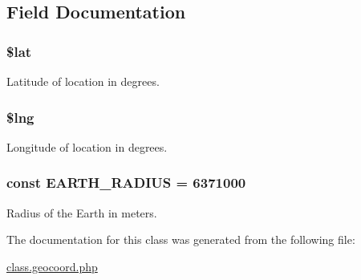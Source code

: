 \subsection{Field Documentation}
\subsubsection[{\texorpdfstring{\$lat}{$lat}}]{\setlength{\rightskip}{0pt plus 5cm}\$lat}\hypertarget{class_geo_coord_af498b42b83afed4dfe0af05fd802776c}{}\label{class_geo_coord_af498b42b83afed4dfe0af05fd802776c}


Latitude of location in degrees. 

\subsubsection[{\texorpdfstring{\$lng}{$lng}}]{\setlength{\rightskip}{0pt plus 5cm}\$lng}\hypertarget{class_geo_coord_ab27bfa6a9380a8d89e1a8e001b276410}{}\label{class_geo_coord_ab27bfa6a9380a8d89e1a8e001b276410}


Longitude of location in degrees. 

\subsubsection[{\texorpdfstring{E\+A\+R\+T\+H\+\_\+\+R\+A\+D\+I\+US}{EARTH_RADIUS}}]{\setlength{\rightskip}{0pt plus 5cm}const E\+A\+R\+T\+H\+\_\+\+R\+A\+D\+I\+US = 6371000}\hypertarget{class_geo_coord_aabaad7a967695e8a9cce7a62bd266873}{}\label{class_geo_coord_aabaad7a967695e8a9cce7a62bd266873}


Radius of the Earth in meters. 



The documentation for this class was generated from the following file\+:\begin{DoxyCompactItemize}
\item 
\hyperlink{class_8geocoord_8php}{class.\+geocoord.\+php}\end{DoxyCompactItemize}
